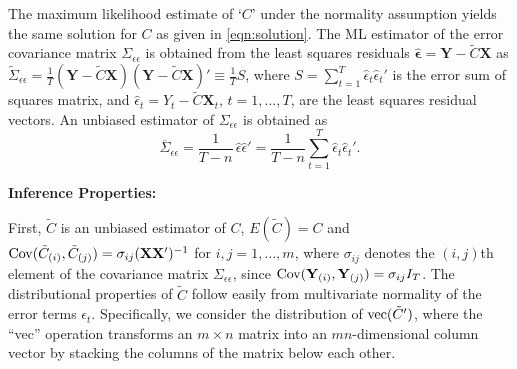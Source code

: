 The maximum likelihood estimate of `$C$' under the normality assumption yields the same solution for $C$ as given in \eqref{eqn:solution}. The ML estimator of the error covariance matrix $\Sigma_{\epsilon\epsilon}$ is obtained from the least squares residuals $\hat{\mathbf{\epsilon}}= \mathbf{Y} - \tilde{C} \mathbf{X}$ as $\tilde{\Sigma}_{\epsilon\epsilon}= \frac{1}{T}(\mathbf{Y} - \tilde{C}\mathbf{X})(\mathbf{Y} - \tilde{C} \mathbf{X})' \equiv \frac{1}{T}S$, where $S= \sum_{t=1}^T \hat{\epsilon}_t \hat{\epsilon}_t'$ is the error sum of squares matrix, and $\hat{\epsilon}_t= Y_t - \tilde{C} \mathbf{X}_t$, $t=1,\ldots,T$, are the least squares residual vectors. An unbiased estimator of $\Sigma_{\epsilon\epsilon}$ is obtained as 
	\begin{equation} \label{eqn:5unbiased}
	\overline{\Sigma}_{\epsilon\epsilon} = \dfrac{1}{T-n} \,\hat{\epsilon} \hat{\epsilon}' = \dfrac{1}{T-n} \sum_{t=1}^T \hat{\epsilon}_t \hat{\epsilon}_t'.
	\end{equation}


\noindent\textbf{Inference Properties:} \twomedskip


First, $\tilde{C}$ is an unbiased estimator of $C$, $E(\tilde{C})= C$ and $\operatorname{Cov}(\tilde{C}_{(i)}, \tilde{C}_{(j)})= \sigma_{ij} (\mathbf{X}\mathbf{X}')^{-1}$ for $i,j= 1,\ldots, m$, where $\sigma_{ij}$ denotes the $(i,j)$th element of the covariance matrix $\Sigma_{\epsilon\epsilon}$, since $\operatorname{Cov}(\mathbf{Y}_{(i)}, \mathbf{Y}_{(j)})= \sigma_{ij} I_T$. The distributional properties of $\tilde{C}$ follow easily from multivariate normality of the error terms $\epsilon_t$. Specifically, we consider the distribution of $\operatorname{vec}(\tilde{C}')$, where the ``vec'' operation transforms an $m \times n$ matrix into an $mn$-dimensional column vector by stacking the columns of the matrix below each other. 


